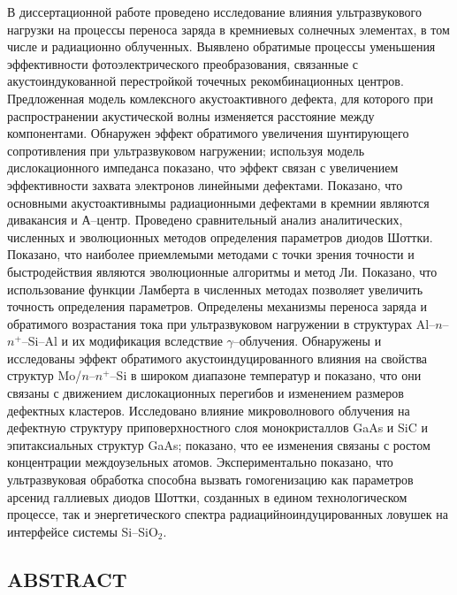 В диссертационной работе проведено исследование влияния ультразвукового нагрузки на процессы переноса заряда в кремниевых солнечных элементах,
 в том числе и радиационно облученных.
 Выявлено обратимые процессы уменьшения эффективности фотоэлектрического преобразования,
 связанные с акустоиндукованной перестройкой точечных рекомбинационных центров.
  Предложенная модель комлексного акустоактивного дефекта, для которого при распространении акустической волны изменяется расстояние между компонентами.
 Обнаружен эффект обратимого увеличения шунтирующего сопротивления при ультразвуковом нагружении;
используя модель дислокационного импеданса показано, что эффект связан с увеличением эффективности захвата электронов линейными дефектами.
 Показано, что основными акустоактивнымы радиационными дефектами в кремнии являются дивакансия и А--центр.
 Проведено сравнительный анализ аналитических, численных и эволюционных методов определения параметров диодов Шоттки.
 Показано, что наиболее приемлемыми методами с точки зрения точности и быстродействия являются эволюционные алгоритмы и метод Ли.
 Показано, что использование функции Ламберта в численных методах позволяет увеличить точность определения параметров.
 Определены механизмы переноса заряда и обратимого возрастания тока при ультразвуковом нагружении
 в структурах Al--$n$--$n^+$--Si--Al и их модификация вследствие $\gamma$--облучения.
 Обнаружены и исследованы эффект обратимого акустоиндуцированного влияния на свойства структур Mo/$n$--$n^{+}$--Si в широком диапазоне температур
 и показано, что они связаны с движением дислокационных перегибов и изменением размеров дефектных кластеров.
 Исследовано влияние микроволнового облучения на дефектную структуру приповерхностного слоя монокристаллов GaAs и SiC и эпитаксиальных структур GaAs;
 показано,  что ее изменения связаны с ростом концентрации междоузельных атомов.
 Экспериментально показано, что ультразвуковая обработка способна вызвать гомогенизацию как параметров арсенид галлиевых диодов Шоттки, созданных в едином технологическом процессе, так и энергетического спектра радиацийноиндуцированных ловушек на интерфейсе системы Si--SiO$_2$.


\keywordsRu


\begin{center}
{\section*{\MakeUppercase{ABSTRACT}}}
\end{center}

